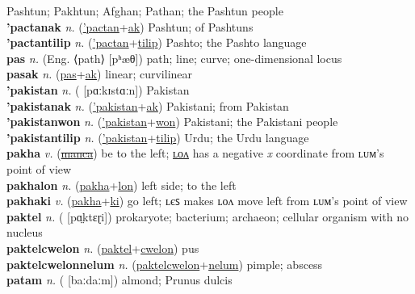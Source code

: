 Pashtun; Pakhtun; Afghan; Pathan; the Pashtun people \label{'pactan} \\
\textbf{'pactanak} \textit{n.} (\hyperref['pactan]{'pactan}+\hyperref[ak]{ak})
Pashtun; of Pashtuns \label{'pactanak} \\
\textbf{'pactantilip} \textit{n.} (\hyperref['pactan]{'pactan}+\hyperref[tilip]{tilip})
Pashto; the Pashto language \label{'pactantilip} \\
\textbf{pas} \textit{n.} (Eng. ⟨path⟩ [pʰæθ])
path; line; curve; one-dimensional locus \label{pas} \\
\textbf{pasak} \textit{n.} (\hyperref[pas]{pas}+\hyperref[ak]{ak})
linear; curvilinear \label{pasak} \\
\textbf{'pakistan} \textit{n.} ( [pɑːkɪstɑːn])
Pakistan \label{'pakistan} \\
\textbf{'pakistanak} \textit{n.} (\hyperref['pakistan]{'pakistan}+\hyperref[ak]{ak})
Pakistani; from Pakistan \label{'pakistanak} \\
\textbf{'pakistanwon} \textit{n.} (\hyperref['pakistan]{'pakistan}+\hyperref[won]{won})
Pakistani; the Pakistani people \label{'pakistanwon} \\
\textbf{'pakistantilip} \textit{n.} (\hyperref['pakistan]{'pakistan}+\hyperref[tilip]{tilip})
Urdu; the Urdu language \label{'pakistantilip} \\
\textbf{pakha} \textit{v.} (\hyperref[manca]{\sout{manca}})
be to the left; \hyperref[pakhalon]{ʟᴏᴧ} has a negative \textit{x} coordinate from ʟᴜᴍ’s point of view \label{pakha} \\
\textbf{pakhalon} \textit{n.} (\hyperref[pakha]{pakha}+\hyperref[lon]{lon})
left side; to the left \label{pakhalon} \\
\textbf{pakhaki} \textit{v.} (\hyperref[pakha]{pakha}+\hyperref[ki]{ki})
go left; ʟєꜱ makes ʟᴏᴧ move left from ʟᴜᴍ’s point of view \label{pakhaki} \\
\textbf{paktel} \textit{n.} ( [pɑ̤ktɛɽi])
prokaryote; bacterium; archaeon; cellular organism with no nucleus \label{paktel} \\
\textbf{paktelcwelon} \textit{n.} (\hyperref[paktel]{paktel}+\hyperref[cwelon]{cwelon})
pus \label{paktelcwelon} \\
\textbf{paktelcwelonnelum} \textit{n.} (\hyperref[paktelcwelon]{paktelcwelon}+\hyperref[nelum]{nelum})
pimple; abscess \label{paktelcwelonnelum} \\
\textbf{patam} \textit{n.} ( [baːdaːm])
almond; Prunus dulcis \label{patam} \\
